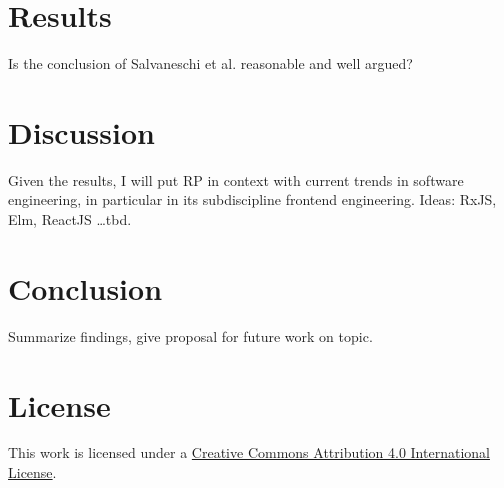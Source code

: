 \documentclass[11pt,a4paper,twocolumn]{article}
\begin{document}
	\section{Results}
	Is the conclusion of Salvaneschi et al. \cite{7827078} reasonable and well argued?

	\section{Discussion}
	Given the results, I will put RP in context with current trends in software engineering, in particular in its subdiscipline frontend engineering.
	Ideas: RxJS, Elm, ReactJS \dots tbd.

	\section{Conclusion}
	Summarize findings, give proposal for future work on topic.

	
	

	\section*{License}
	\ccby\thinspace\thinspace This work is licensed under a \href{https://creativecommons.org/licenses/by/4.0/}{Creative Commons Attribution 4.0 International License}.
\end{document}

